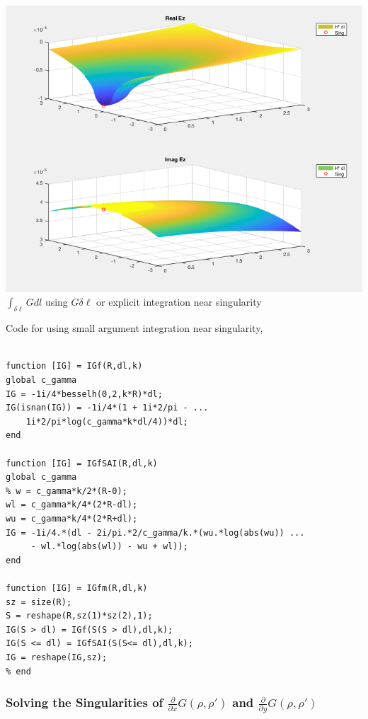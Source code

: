 \documentclass{article}
\newcommand{\0}{\varnothing}
\begin{document}
\begin{minipage}{0.5\textwidth}
{\centering
\includegraphics[width=0.95\columnwidth]{figures/GSingMod}\\
$\int_{\delta \ell} G dl$ using $G \delta \ell$ or explicit integration near singularity
}
\end{minipage}
\begin{minipage}{0.5\textwidth}
Code for using small argument integration near singularity,

\begin{verbatim}

function [IG] = IGf(R,dl,k)
global c_gamma
IG = -1i/4*besselh(0,2,k*R)*dl;
IG(isnan(IG)) = -1i/4*(1 + 1i*2/pi - ...
    1i*2/pi*log(c_gamma*k*dl/4))*dl;
end

function [IG] = IGfSAI(R,dl,k)
global c_gamma
% w = c_gamma*k/2*(R-0);
wl = c_gamma*k/4*(2*R-dl);
wu = c_gamma*k/4*(2*R+dl);
IG = -1i/4.*(dl - 2i/pi.*2/c_gamma/k.*(wu.*log(abs(wu)) ...
     - wl.*log(abs(wl)) - wu + wl));
end

function [IG] = IGfm(R,dl,k)
sz = size(R);
S = reshape(R,sz(1)*sz(2),1);
IG(S > dl) = IGf(S(S > dl),dl,k);
IG(S <= dl) = IGfSAI(S(S<= dl),dl,k);
IG = reshape(IG,sz);
% end
\end{verbatim}

\end{minipage}

\subsubsection{Solving the Singularities of $\frac{\partial}{\partial x} G(\rho, \rho')$ and $\frac{\partial}{\partial y} G(\rho, \rho')$}
\end{document}
